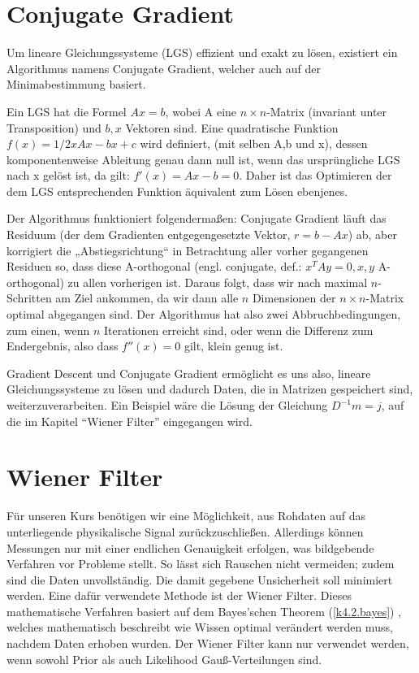 \documentclass[]{dsadokumentation}
\begin{document}
\section{Conjugate Gradient}

Um lineare Gleichungssysteme (LGS) effizient und exakt zu lösen, existiert ein Algorithmus namens Conjugate Gradient, welcher auch auf der Minimabestimmung basiert.

Ein LGS hat die Formel $Ax = b$, wobei A eine $ n \times n $-Matrix (invariant unter Transposition) und $ b,x $ Vektoren sind. Eine quadratische Funktion $ f(x) = 1/2xAx-bx+c $ wird definiert, (mit selben A,b und x), dessen komponentenweise Ableitung genau dann null ist, wenn das ursprüngliche LGS nach x gelöst ist, da gilt: $f'(x) = Ax-b = 0$. Daher ist das Optimieren der dem LGS entsprechenden Funktion äquivalent zum Lösen ebenjenes.

Der Algorithmus funktioniert folgendermaßen: Conjugate Gradient läuft das Residuum (der dem Gradienten entgegengesetzte Vektor, $ r = b-Ax $) ab, aber korrigiert die „Abstiegsrichtung“ in Betrachtung aller vorher gegangenen Residuen so, dass diese A-orthogonal (engl. conjugate, def.: $x^TAy = 0, x,y$ A-orthogonal) zu allen vorherigen ist. Daraus folgt, dass wir nach maximal $n$-Schritten am Ziel ankommen, da wir dann alle $n$ Dimensionen der $ n \times n $-Matrix optimal abgegangen sind. Der Algorithmus hat also zwei Abbruchbedingungen, zum einen, wenn $n$ Iterationen erreicht sind, oder wenn die Differenz zum Endergebnis, also dass $ f''(x) = 0 $ gilt, klein genug ist.

Gradient Descent und Conjugate Gradient ermöglicht es uns also, lineare Gleichungssysteme zu lösen und dadurch Daten, die in Matrizen gespeichert sind, weiterzuverarbeiten. Ein Beispiel wäre die Lösung der Gleichung $ D^{-1} m = j $, auf die im Kapitel \enquote{Wiener Filter} eingegangen wird.

\section{Wiener Filter}\label{k4.2.wiener.filter}

Für unseren Kurs benötigen wir eine Möglichkeit, aus Rohdaten auf das unterliegende physikalische Signal zurückzuschließen. Allerdings können Messungen nur mit einer endlichen Genauigkeit erfolgen, was bildgebende Verfahren vor Probleme stellt. So lässt sich Rauschen nicht vermeiden; zudem sind die Daten unvollständig. Die damit gegebene Unsicherheit soll minimiert werden. Eine dafür verwendete Methode ist der Wiener Filter.
Dieses mathematische Verfahren basiert auf dem Bayes'schen Theorem
(\ref{k4.2.bayes})
, welches mathematisch beschreibt wie Wissen optimal verändert werden muss, nachdem Daten erhoben wurden. Der Wiener Filter kann nur verwendet werden, wenn sowohl Prior als auch Likelihood Gauß-Verteilungen sind.
\end{document}
